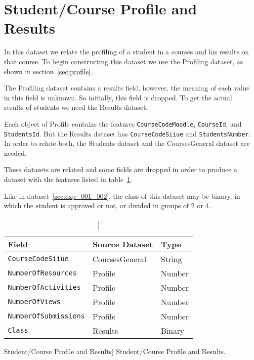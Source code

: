 \section{Student/Course Profile and Results}

In this dataset we relate the profiling of a student in a courses and his
results on that course. To begin constructing this dataset we use the Profiling
dataset, as shown in section~\ref{sec:profile}.

The Profiling dataset contains a results field, however, the meaning of each
value in this field is unknown. So initially, this field is dropped. To get the
actual results of students we need the Results dataset.

Each object of Profile contains the features \texttt{CourseCodeMoodle},
\texttt{CourseId}, and \texttt{StudentsId}. But the Results dataset has
\texttt{CourseCodeSiiue} and \texttt{StudentsNumber}. In order to relate both,
the Students dataset and the CoursesGeneral dataset are needed.

These datasets are related and some fields are dropped in order to produce a
dataset with the features listed in table~\ref{tab:dat_003}.

Like in dataset~\ref{sec:exp_001_002}, the class of this dataset may be binary, in
which the student is approved or not, or divided in groups of 2 or 4.

\begin{table}[h!]
    \centering

    \begin{tabular}{| l | l | l |}
        \hline
        \textbf{Field}               & \textbf{Source Dataset} & \textbf{Type} \\ \hline
        \texttt{CourseCodeSiiue}     & CoursesGeneral          & String        \\ \hline
        \texttt{NumberOfResources}   & Profile                 & Number        \\ \hline
        \texttt{NumberOfActivities}  & Profile                 & Number        \\ \hline
        \texttt{NumberOfViews}       & Profile                 & Number        \\ \hline
        \texttt{NumberOfSubmissions} & Profile                 & Number        \\ \hline
        \texttt{Class}               & Results                 & Binary        \\ \hline
    \end{tabular}

    \caption
        [Student/Course Profile and Results]
        {Student/Course Profile and Results.}

    \label{tab:dat_003}
\end{table}

